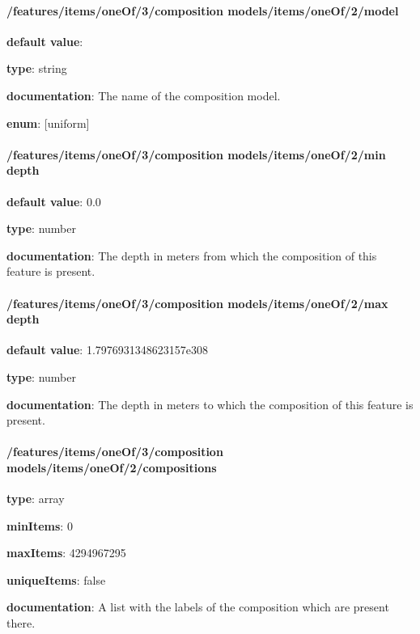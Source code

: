 \paragraph{/features/items/oneOf/3/composition models/items/oneOf/2/model} \begin{itemized}
\item {\bf default value}: 
\item {\bf type}: string
\item {\bf documentation}: The name of the composition model.
\item {\bf enum}: [uniform]\end{itemized}\paragraph{/features/items/oneOf/3/composition models/items/oneOf/2/min depth} \begin{itemized}
\item {\bf default value}: 0.0
\item {\bf type}: number
\item {\bf documentation}: The depth in meters from which the composition of this feature is present.
\end{itemized}\paragraph{/features/items/oneOf/3/composition models/items/oneOf/2/max depth} \begin{itemized}
\item {\bf default value}: 1.7976931348623157e308
\item {\bf type}: number
\item {\bf documentation}: The depth in meters to which the composition of this feature is present.
\end{itemized}\paragraph{/features/items/oneOf/3/composition models/items/oneOf/2/compositions} \begin{itemized}
\item {\bf type}: array
\item {\bf minItems}: 0
\item {\bf maxItems}: 4294967295
\item {\bf uniqueItems}: false
\item {\bf documentation}: A list with the labels of the composition which are present there.

\end{itemized}
